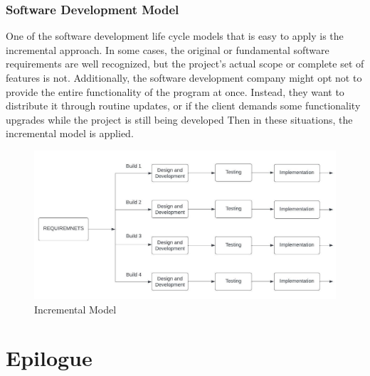 \subsection{Software Development Model}
\vspace{-18pt}
One of the software development life cycle models that is easy to apply is the incremental approach. In some cases, the original or fundamental software requirements are well recognized, but the project's actual scope or complete set of features is not. Additionally, the software development company might opt not to provide the entire functionality of the program at once. Instead, they want to distribute it through routine updates, or if the client demands some functionality upgrades while the project is still being developed Then in these situations, the incremental model is applied.
 \begin{figure}[tbh] %
\begin{center}
	\includegraphics[width=5in]{images/sdlc1.jpg} 
	\caption{Incremental Model} %
	\label{Incremental Model} %
\end{center}
\end{figure}

\chapter{Epilogue}
\vspace{-18pt}

